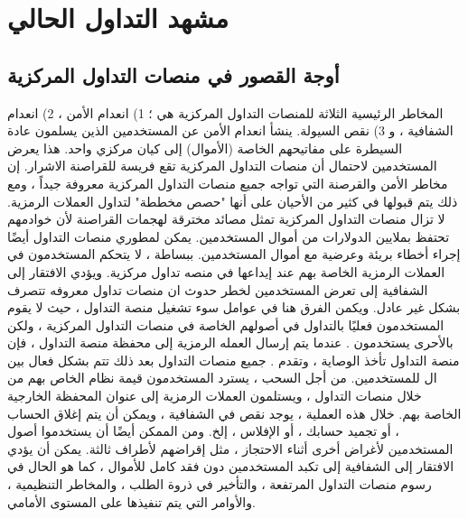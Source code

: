 \documentclass[12pt, a4paper, leqno]{report}
\theoremstyle{plain}
\theoremstyle{definition}
\begin{document}
\chapter{مشهد التداول الحالي}
\begin{multicols}{2}
\section{أوجة القصور في منصات التداول المركزية}
\begin{otherlanguage}{arabic}
المخاطر الرئيسية الثلاثة للمنصات التداول المركزية هي ؛ 1) انعدام الأمن ، 2) انعدام الشفافية ، و 3) نقص السيولة.
ينشأ انعدام الأمن عن المستخدمين الذين يسلمون عادة السيطرة على مفاتيحهم الخاصة (الأموال) إلى كيان مركزي واحد. هذا يعرض   المستخدمين لاحتمال أن منصات التداول المركزية تقع فريسة للقراصنة الاشرار. إن مخاطر الأمن والقرصنة التي تواجه جميع منصات التداول  المركزية معروفة جيداً  ، ومع ذلك يتم قبولها في كثير من الأحيان على أنها "حصص مخططة" لتداول العملات الرمزية. لا تزال منصات التداول المركزية تمثل مصائد مخترقة لهجمات القراصنة لأن خوادمهم تحتفظ بملايين الدولارات من أموال المستخدمين. يمكن لمطوري منصات التداول  أيضًا إجراء أخطاء بريئة وعرضية مع أموال المستخدمين. ببساطة ، لا يتحكم المستخدمون في العملات الرمزية الخاصة بهم عند إيداعها في منصه تداول مركزية.
ويؤدي الافتقار إلى الشفافية إلى تعرض المستخدمين لخطر حدوث ان منصات تداول معروفه تتصرف بشكل غير عادل. ويكمن الفرق هنا في عوامل سوء تشغيل منصة التداول ، حيث لا يقوم المستخدمون فعليًا بالتداول في أصولهم الخاصة في منصات التداول المركزية ، ولكن بالأحرى يستخدمون  . عندما يتم إرسال العمله الرمزية إلى محفظة منصة التداول ، فإن منصة التداول تأخذ الوصاية ، وتقدم . جميع منصات التداول بعد ذلك تتم بشكل فعال بين ال  للمستخدمين. من أجل السحب ، يسترد المستخدمون قيمة نظام  الخاص بهم من خلال منصات التداول  ، ويستلمون العملات الرمزية إلى عنوان المحفظة الخارجية الخاصة بهم. خلال هذه العملية ، يوجد نقص في الشفافية ، ويمكن أن يتم إغلاق الحساب ، أو تجميد حسابك ، أو الإفلاس ، إلخ. ومن الممكن أيضًا أن يستخدموا أصول المستخدمين لأغراض أخرى أثناء الاحتجاز ، مثل إقراضهم لأطراف ثالثة. يمكن أن يؤدي الافتقار إلى الشفافية إلى تكبد المستخدمين دون فقد كامل للأموال ، كما هو الحال في رسوم منصات التداول المرتفعة ، والتأخير في ذروة الطلب ، والمخاطر التنظيمية ، والأوامر التي يتم تنفيذها على المستوى الأمامي.

\end{otherlanguage}
\end{multicols}
\end{document}
